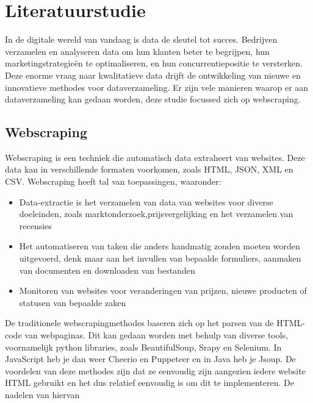 
\section{Literatuurstudie}
\label{sec:Literatuurstudie}
In de digitale wereld van vandaag is data de sleutel tot succes. Bedrijven verzamelen en analyseren data om hun klanten beter te begrijpen, 
hun marketingstrategieën te optimaliseren, en hun concurrentiepositie te versterken. Deze enorme vraag naar kwalitatieve data drijft de ontwikkeling 
van nieuwe en innovatieve methodes voor dataverzameling. Er zijn vele manieren waarop er aan dataverzameling kan gedaan worden, deze studie focussed
zich op webscraping.

\subsection{Webscraping}
\label{sec:Webscraping}
Webscraping is een techniek die automatisch data extraheert van websites. Deze data kan in verschillende formaten
voorkomen, zoals HTML, JSON, XML en CSV. Webscraping heeft tal van toepassingen, waaronder:
\begin{itemize}
  \item Data-extractie is het verzamelen van data van websites voor diverse doeleinden, 
      zoals marktonderzoek,prijsvergelijking en het verzamelen van recensies
  \item Het automatiseren van taken die anders handmatig zouden moeten worden uitgevoerd, denk maar 
  aan het invullen van bepaalde formuliers, aanmaken van documenten en downloaden van bestanden
  \item Monitoren van websites voor veranderingen van prijzen, nieuwe producten of statusen van bepaalde zaken
\end{itemize}

De traditionele webscrapingmethodes baseren zich op het parsen van de HTML-code van webpaginas.
Dit kan gedaan worden met behulp van diverse tools, voornamelijk python libraries, zoals BeautifulSoup, Srapy en Selenium.
In JavaScript heb je dan weer Cheerio en Puppeteer en in Java heb je Jsoup. De voordelen van deze methodes zijn
dat ze eenvoudig zijn aangezien iedere website HTML gebruikt en het dus relatief eenvoudig is om dit te implementeren.
De nadelen van hiervan 



